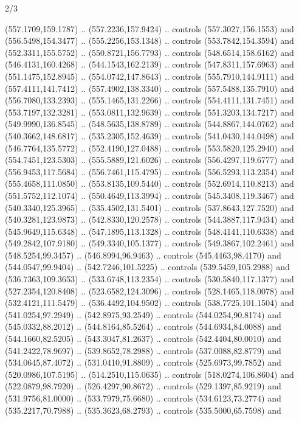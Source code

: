 \begin{flagdescription}{2/3}
\begin{scope}[xshift=0.5\flaglength,yshift=0.5\flagwidth,scale=\flagwidth/562]
\begin{scope}[y=1pt, x=1pt, yscale=-1,shift={(-421.88,-281.25)}]
  (557.1709,159.1787) .. (557.2236,157.9424) .. controls (557.3027,156.1553) and
  (556.5498,154.3477) .. (555.2256,153.1348) .. controls (553.7842,154.3594) and
  (552.3311,155.5752) .. (550.8721,156.7793) .. controls (548.6514,158.6162) and
  (546.4131,160.4268) .. (544.1543,162.2139) .. controls (547.8311,157.6963) and
  (551.1475,152.8945) .. (554.0742,147.8643) .. controls (555.7910,144.9111) and
  (557.4111,141.7412) .. (557.4902,138.3340) .. controls (557.5488,135.7910) and
  (556.7080,133.2393) .. (555.1465,131.2266) .. controls (554.4111,131.7451) and
  (553.7197,132.3281) .. (553.0811,132.9639) .. controls (551.3203,134.7217) and
  (549.9990,136.8545) .. (548.5635,138.8789) .. controls (544.8867,144.0762) and
  (540.3662,148.6817) .. (535.2305,152.4639) .. controls (541.0430,144.0498) and
  (546.7764,135.5772) .. (552.4190,127.0488) .. controls (553.5820,125.2940) and
  (554.7451,123.5303) .. (555.5889,121.6026) .. controls (556.4297,119.6777) and
  (556.9453,117.5684) .. (556.7461,115.4795) .. controls (556.5293,113.2354) and
  (555.4658,111.0850) .. (553.8135,109.5440) .. controls (552.6914,110.8213) and
  (551.5752,112.1074) .. (550.4649,113.3994) .. controls (545.3408,119.3467) and
  (540.3340,125.3965) .. (535.4502,131.5401) .. controls (537.8643,127.7520) and
  (540.3281,123.9873) .. (542.8330,120.2578) .. controls (544.3887,117.9434) and
  (545.9649,115.6348) .. (547.1895,113.1328) .. controls (548.4141,110.6338) and
  (549.2842,107.9180) .. (549.3340,105.1377) .. controls (549.3867,102.2461) and
  (548.5254,99.3457) .. (546.8994,96.9463) .. controls (545.4463,98.4170) and
  (544.0547,99.9404) .. (542.7246,101.5225) .. controls (539.5459,105.2988) and
  (536.7363,109.3653) .. (533.6748,113.2354) .. controls (530.5840,117.1377) and
  (527.2354,120.8408) .. (523.6582,124.3096) .. controls (528.1465,118.0078) and
  (532.4121,111.5479) .. (536.4492,104.9502) .. controls (538.7725,101.1504) and
  (541.0254,97.2949) .. (542.8975,93.2549) .. controls (544.0254,90.8174) and
  (545.0332,88.2012) .. (544.8164,85.5264) .. controls (544.6934,84.0088) and
  (544.1660,82.5205) .. (543.3047,81.2637) .. controls (542.4404,80.0010) and
  (541.2422,78.9697) .. (539.8652,78.2988) .. controls (537.0088,82.8779) and
  (534.0645,87.4072) .. (531.0410,91.8809) .. controls (525.6973,99.7852) and
  (520.0986,107.5195) .. (514.2510,115.0635) .. controls (518.0274,106.8604) and
  (522.0879,98.7920) .. (526.4297,90.8672) .. controls (529.1397,85.9219) and
  (531.9756,81.0000) .. (533.7979,75.6680) .. controls (534.6123,73.2774) and
  (535.2217,70.7988) .. (535.3623,68.2793) .. controls (535.5000,65.7598) and

\end{scope}
\end{scope}
\end{flagdescription}
